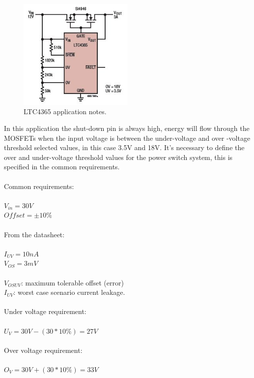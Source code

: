 \begin{figure}[H]
	\begin{centering}
		\includegraphics[width=0.5\textwidth]{images/ltc4365.png}
		\caption{LTC4365 application notes.}
	\end{centering}
\end{figure}
In this application the shut-down pin is always high, energy will flow through the MOSFETs when the input voltage is between the under-voltage and over -voltage threshold selected values, in this case 3.5V and 18V.
%
It's necessary to define the over and under-voltage threshold values for the power switch system, this is specified in the common requirements.\\
\\
Common requirements:\\\\
$V_{in} = 30V$ \\
$Offset = \pm 10\% $\\
\\
From the datasheet:\\\\
$ I_{UV} = 10nA $ \\
$ V_{OS} = 3mV $\\
\\
$V_{OSUV}$: maximum tolerable offset (error)\\
$I_{UV}$: worst case scenario current leakage.\\
\\
Under voltage requirement:\\\\
$ U_V=30V-(30*10\%)=27V $\\
\\
Over voltage requirement:\\\\
$ O_V=30V+(30*10\%)=33V $\\
\\
